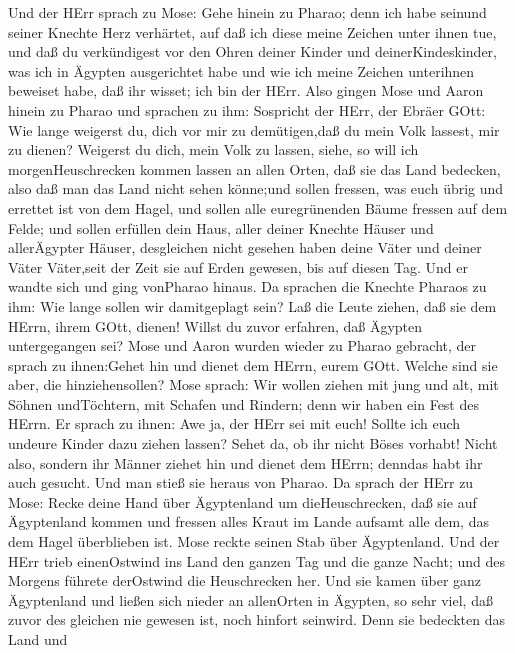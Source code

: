  Und der HErr sprach zu Mose: Gehe hinein zu Pharao; denn
ich habe seinund seiner Knechte Herz verhärtet, auf daß ich diese meine
Zeichen unter ihnen tue,  und daß du verkündigest vor den
Ohren deiner Kinder und deinerKindeskinder, was ich in Ägypten
ausgerichtet habe und wie ich meine Zeichen unterihnen beweiset habe,
daß ihr wisset; ich bin der HErr.  Also gingen Mose und
Aaron hinein zu Pharao und sprachen zu ihm: Sospricht der HErr, der
Ebräer GOtt: Wie lange weigerst du, dich vor mir zu demütigen,daß du
mein Volk lassest, mir zu dienen?  Weigerst du dich, mein
Volk zu lassen, siehe, so will ich morgenHeuschrecken kommen lassen an
allen Orten,  daß sie das Land bedecken, also daß man das
Land nicht sehen könne;und sollen fressen, was euch übrig und errettet
ist von dem Hagel, und sollen alle euregrünenden Bäume fressen auf dem
Felde;  und sollen erfüllen dein Haus, aller deiner Knechte
Häuser und allerÄgypter Häuser, desgleichen nicht gesehen haben deine
Väter und deiner Väter Väter,seit der Zeit sie auf Erden gewesen, bis
auf diesen Tag. Und er wandte sich und ging vonPharao hinaus.
 Da sprachen die Knechte Pharaos zu ihm: Wie lange sollen
wir damitgeplagt sein? Laß die Leute ziehen, daß sie dem HErrn, ihrem
GOtt, dienen! Willst du zuvor erfahren, daß Ägypten untergegangen sei?
 Mose und Aaron wurden wieder zu Pharao gebracht, der sprach
zu ihnen:Gehet hin und dienet dem HErrn, eurem GOtt. Welche sind sie
aber, die hinziehensollen?  Mose sprach: Wir wollen ziehen
mit jung und alt, mit Söhnen undTöchtern, mit Schafen und Rindern; denn
wir haben ein Fest des HErrn.  Er sprach zu ihnen: Awe ja,
der HErr sei mit euch! Sollte ich euch undeure Kinder dazu ziehen
lassen? Sehet da, ob ihr nicht Böses vorhabt!  Nicht also,
sondern ihr Männer ziehet hin und dienet dem HErrn; denndas habt ihr
auch gesucht. Und man stieß sie heraus von Pharao.  Da
sprach der HErr zu Mose: Recke deine Hand über Ägyptenland um
dieHeuschrecken, daß sie auf Ägyptenland kommen und fressen alles Kraut
im Lande aufsamt alle dem, das dem Hagel überblieben ist. 
Mose reckte seinen Stab über Ägyptenland. Und der HErr trieb
einenOstwind ins Land den ganzen Tag und die ganze Nacht; und des
Morgens führete derOstwind die Heuschrecken her.  Und sie
kamen über ganz Ägyptenland und ließen sich nieder an allenOrten in
Ägypten, so sehr viel, daß zuvor des gleichen nie gewesen ist, noch
hinfort seinwird.  Denn sie bedeckten das Land und
